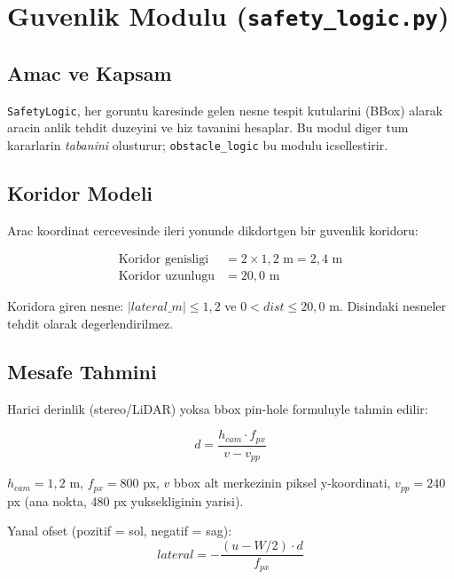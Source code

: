 \documentclass[a4paper,12pt]{article}
\begin{document}
\section{Guvenlik Modulu (\texttt{safety\_logic.py})}

\subsection{Amac ve Kapsam}

\texttt{SafetyLogic}, her goruntu karesinde gelen nesne tespit kutularini
(BBox) alarak aracin anlik tehdit duzeyini ve hiz tavanini hesaplar. Bu modul
diger tum kararlarin \emph{tabanini} olusturur; \texttt{obstacle\_logic}
bu modulu icsellestirir.

\subsection{Koridor Modeli}

Arac koordinat cercevesinde ileri yonunde dikdortgen bir guvenlik koridoru:

\begin{align}
  \text{Koridor genisligi} &= 2 \times 1{,}2\text{ m} = 2{,}4\text{ m}\\
  \text{Koridor uzunlugu} &= 20{,}0\text{ m}
\end{align}

\begin{notebox}
Koridora giren nesne: $|lateral\_m| \leq 1{,}2$ ve $0 < dist \leq 20{,}0$ m.
Disindaki nesneler tehdit olarak degerlendirilmez.
\end{notebox}

\subsection{Mesafe Tahmini}

Harici derinlik (stereo/LiDAR) yoksa bbox pin-hole formuluyle tahmin edilir:

\begin{equation}
  d = \frac{h_{cam} \cdot f_{px}}{v - v_{pp}}
\end{equation}

$h_{cam}=1{,}2$ m, $f_{px}=800$ px, $v$ bbox alt merkezinin piksel
y-koordinati, $v_{pp}=240$ px (ana nokta, 480 px yuksekliginin yarisi).

Yanal ofset (pozitif = sol, negatif = sag):
\begin{equation}
  lateral = -\frac{(u - W/2) \cdot d}{f_{px}}
\end{equation}
\end{document}
